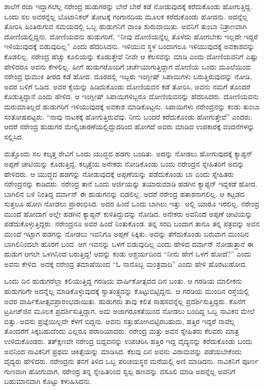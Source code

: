 ಶಾಲೆಗೆ ರಜಾ ಇದ್ದಾಗಲೆಲ್ಲ ನರೇಂದ್ರ ಹುಡುಗರನ್ನು ಬೇರೆ ಬೇರೆ ಕಡೆ ನೋಡುವುದಕ್ಕೆ ಕರೆದುಕೊಂಡು ಹೋಗುತ್ತಿದ್ದ. ಒಂದು ಸಲ ಅವರನ್ನೆಲ್ಲ ಬೊಟಾನಿಕಲ್ ತೋಟಕ್ಕೆ ಗಂಗಾನದಿಯ ಮೂಲಕ ಕರೆದುಕೊಂಡು ಹೋದನು. ಅದನ್ನೆಲ್ಲ ತೋರಿಸಿ ಹಿಂತಿರುಗುವ ಸಮಯದಲ್ಲಿ ಒಬ್ಬ ಹುಡುಗನಿಗೆ ವಾಂತಿ ಶುರುವಾಯಿತು. ಅವನಿಗೆ ತುಂಬಾ ನಿತ್ರಾಣವಾಗಿ ದೋಣಿಯಲ್ಲಿದ್ದನು. ದೋಣಿಯವನು ಹುಡುಗರಿಗೆ, “ನೀವು ದೋಣಿಯನ್ನೆಲ್ಲ ತೊಳೆದು ಹೋಗಬೇಕು ಇಲ್ಲದೇ ಇದ್ದರೆ ಇಳಿಯುವುದಕ್ಕೆ ಬಿಡುವುದಿಲ್ಲ” ಎಂದು ಹೆದರಿಸಿದನು. ಇಳಿಯುವ ಸ್ಥಳ ಬಂದಾಗಲೂ ಇಳಿಯುವುದಕ್ಕೆ ಅವಕಾಶವನ್ನು ಕೊಡಲಿಲ್ಲ. ನರೇಂದ್ರ ಹೆಚ್ಚು ಕೂಲಿಯನ್ನು ಕೊಡುತ್ತೇವೆ ನೀವೇ ಆ ಕೆಲಸವನ್ನು ಮಾಡಿ ಎಂದು ದೋಣಿಯವನಿಗೆ ಎಷ್ಟು ಹೇಳಿದರೂ ಅವನು ಕೇಳಲಿಲ್ಲ. ಹೀಗೆ ಹುಡುಗರೊಂದಿಗೆ ಚರ್ಚೆಯಾಗುತ್ತಿದ್ದಾಗ ದೋಣಿಯ ಒಂದು ಮೂಲೆಯಿಂದ ನರೇಂದ್ರ ಧುಮುಕಿ ತೀರದ ಕಡೆ ಹೋದ. ದೂರದಲ್ಲಿ ಇಬ್ಬರು ಇಂಗ್ಲೀಷ್ ಸಿಪಾಯಿಗಳು ಬರುತ್ತಿರುವುದನ್ನು ನೋಡಿ, ಅವರ ಬಳಿಗೆ ಓಡಿದ. ಅವರ ಕೈಯನ್ನು ಹಿಡಿದುಕೊಂಡು ದೋಣಿಯವನ ಕಡೆ ತೋರಿಸಿ, ಅವನು ನಮಗೆ ತೊಂದರೆ ಕೊಡುತ್ತಿದ್ದಾನೆ ಎಂದು ಹೇಳಿದ. ಆ ಇಂಗ್ಲೀಷ್ ಸಿಪಾಯಿಗಳಿಬ್ಬರೂ ದೋಣಿಯವನನ್ನು ಹೆದರಿಸಿದರು. ದೋಣಿಯವನು ಮರುಮಾತಿಲ್ಲದೆ ಹುಡುಗರಿಗೆ ಇಳಿಯುವುದಕ್ಕೆ ಅವಕಾಶ ಮಾಡಿಕೊಟ್ಟನು. ಸಿಪಾಯಿಗಳು ನರೇಂದ್ರನನ್ನು ಕಂಡು ತುಂಬಾ ಸಂತೋಷಪಟ್ಟರು. “ನಾವು ನಾಟಕಕ್ಕೆ ಹೋಗುತ್ತಿರುವೆವು. ನೀನು ಬಂದರೆ ಕರೆದುಕೊಂಡು ಹೋಗುತ್ತೇವೆ” ಎಂದರು. ಆದರೆ ನರೇಂದ್ರ ಹುಡುಗರ ಮೇಲ್ವಿಚಾರಣೆಯಲ್ಲಿದ್ದುದರಿಂದ ಹೋಗದೆ ಅವರು ಮಾಡಿದ ಉಪಕಾರಕ್ಕೆ ವಂದನೆಗಳನ್ನು ಸಲ್ಲಿಸಿದ.

ಮತ್ತೊಂದು ಸಲ ಕಲ್ಕತ್ತ ರೇವಿಗೆ ಒಂದು ಯುದ್ಧದ ಹಡಗು ಬಂದಿತು. ಅದನ್ನು ನೋಡಲು ಹೋಗುವುದಕ್ಕೆ ಕ್ಯಾಪ್ಟನ್ ಅಪ್ಪಣೆ ಚೀಟಿಯನ್ನು ಕೊಡುತ್ತಿದ್ದ. ಕಲ್ಕತ್ತೆಯ ಅನೇಕರು ನೋಡಿಕೊಂಡು ಬಂದು ನರೇಂದ್ರನ ಸ್ನೇಹಿತರಿಗೆ ಅದನ್ನು ಹೇಳಿದರು. ಆ ಯುದ್ಧದ ಹಡಗನ್ನು ನೋಡುವುದಕ್ಕೆ ಅಪ್ಪಣೆಯನ್ನು ಪಡೆದುಕೊಂಡು ಬಾ ಎಂದು ಸ್ನೇಹಿತರು ನರೇಂದ್ರನನ್ನು ಕಾಡಿದರು. ನರೇಂದ್ರ ತಾನೆ ಒಂದು ಅರ್ಜಿಯನ್ನು ತಯಾರುಮಾಡಿ ಹಡಗಿನ ಕ್ಯಾಪ್ಟನ್ ಇದ್ದಕಡೆ ಹೋದ. ಬಾಗಿಲಿನ ಬಳಿ ನಿಂತಿದ್ದ ದರ್ವಾನ್ ಈ ಹುಡುಗನನ್ನು ಬಿಡಲಿಲ್ಲ. ಆದರೆ ನರೇಂದ್ರ ಹತಾಶನಾಗಲಿಲ್ಲ. ಆ ಕಟ್ಟಡದ ಸುತ್ತಲೂ ಹೋಗಿ ನೋಡಲು ಪ್ರಾರಂಭಿಸಿದ. ಅದರ ಹಿಂದೆ ಒಂದು ಬಾಗಿಲು ಇತ್ತು. ಅಲ್ಲಿ ಯಾರೂ ಇರಲಿಲ್ಲ. ನರೇಂದ್ರ ಮುಂದೆ ಹೋದಾಗ ಅಲ್ಲೇ ಹಡಗಿನ ಕ್ಯಾಪ್ಟನ್ ಕುಳಿತಿದ್ದುದನ್ನು ನೋಡಿದ. ಅನೇಕರು ಅವನಿಂದ ಅಪ್ಪಣೆ ಚೀಟಿಯನ್ನು ಪಡೆದುಕೊಳ್ಳುತ್ತಿದ್ದರು. ನರೇಂದ್ರನೂ ಅವರ ಹಿಂದೆ ನಿಂತುಕೊಂಡ. ತನ್ನ ಸರದಿ ಬಂದಾಗ ತಾನೂ ತನ್ನ ಪತ್ರವನ್ನು ಅವನ ಮುಂದೆ ಇಟ್ಟಾಗ ಹಡಗನ್ನು ನೋಡಲು ಇವನಿಗೂ ಅಪ್ಪಣೆ ಸಿಕ್ಕಿತು. ಅದನ್ನು ತೆಗೆದುಕೊಂಡು ಬರುವಾಗ ಮುಂದಿನ ಬಾಗಿಲಿನಿಂದಲೇ ಹೊರಗೆ ಬಂದ. ಆಗ ಇವನನ್ನು ಒಳಗೆ ಬಿಡುವುದಿಲ್ಲ ಎಂದು ಹೇಳಿದ ದರ್ವಾನ್ ನೋಡುತ್ತಾನೆ ಈ ಹುಡುಗ ಆಗಲೇ ಒಳಗಿನಿಂದ ಬರುತ್ತಿದ್ದ! ಅದನ್ನು ಕಂಡು ಆಶ್ಚರ್ಯದಿಂದ “ನೀನು ಹೇಗೆ ಒಳಗೆ ಹೋದೆ?” ಎಂದು ಅವನು ಕೇಳಿದ. ಅದಕ್ಕೆ ನರೇಂದ್ರ ತಮಾಷೆಯಿಂದ “ಓ ನಾನೊಬ್ಬ ಮಂತ್ರವಾದಿ” ಎಂದು ಹೇಳಿ ಹೊರಟುಹೋದ.

ಒಂದು ದಿನ ಹುಡುಗರೆಲ್ಲಾ ಕಲಿಯುತ್ತಿದ್ದ ಗರಡಿಯ ವಾರ್ಷಿಕೋತ್ಸವದ ದಿನ ಬಂತು. ಆ ಗರಡಿಯ ಮಾಲೀಕನು ಹುಡುಗರಿಗೇ ಅದನ್ನೆಲ್ಲ ಮಾಡಿಕೊಳ್ಳುವುದಕ್ಕೆ ಸ್ವಾತಂತ್ರ್ಯವನ್ನು ಕೊಟ್ಟುಬಿಟ್ಟಿದ್ದನು. ಆ ಗರಡಿಯ ಮುಂದಿನ ರಸ್ತೆಯಲ್ಲಿ ಅವರ ವಾರ್ಷಿಕೋತ್ಸವ\break ಪ್ರಾರಂಭವಾಯಿತು. ಹುಡುಗರು ತಾವು ಕಲಿತ ಸಾಹಸವನ್ನೆಲ್ಲ ಪ್ರದರ್ಶಿಸುತ್ತಿದ್ದರು. ಕೊನೆಗೆ ಟ್ರಪೀಜ್​ಜಿನ ಮೂಲಕ ಪ್ರದರ್ಶಿಸುತ್ತಿದ್ದಾಗ, ಅದು ಅಜಾಗರೂಕತೆಯಿಂದ ನೋಡಲು ಬಂದಿದ್ದ ಒಬ್ಬ ನಾವಿಕನ ಮೇಲೆ ಬಿತ್ತು. ಅವನು ಪ್ರಜ್ಞೆಯಿಲ್ಲದೇ ಕೆಳಗೆ ಬಿದ್ದನು. ಅವನು ಸತ್ತುಹೋಗಿಬಿಟ್ಟಿರಬಹುದು, ಹತ್ತಿರ ಇದ್ದರೆ ನಾವೆಲ್ಲ ತೊಂದರೆಗೆ ಸಿಕ್ಕಬಹುದೆಂದು ಎಲ್ಲರೂ ಪರಾರಿಯಾದರು. ನರೇಂದ್ರ ಮತ್ತು ಅವನ ಸ್ನೇಹಿತರು ಕೆಲವರು ಮಾತ್ರ ಉಳಿದುಕೊಂಡರು. ತತ್‍ಕ್ಷಣವೇ ನರೇಂದ್ರ ಬಿದ್ದವನನ್ನು ಉಪಚರಿಸಿ ಹತ್ತಿರ ಇದ್ದ ವೈದ್ಯನನ್ನು ಕರೆದುಕೊಂಡು ಬಂದು ಅವನಿಂದ ನಾವಿಕನಿಗೆ ಪ್ರಥಮ ಚಿಕಿತ್ಸೆಯನ್ನು ಮಾಡಿಸಿದ. ಕೆಲವು ದಿನ ಅವನು ವಿರಾಮವನ್ನು ಪಡೆಯಬೇಕೆಂದು ವೈದ್ಯರು ಹೇಳಿದರು. ನರೇಂದ್ರನು ತನಗೆ ತಿಳಿದ ಒಬ್ಬ ಪರಿಚಯಸ್ಥರ ಮನೆಯಲ್ಲಿ ಅಣಿ ಮಾಡಿದನು. ನಾವಿಕನಿಗೆ ಪೂರ್ಣ ಗುಣವಾಗಿ ಹೋಗುವಾಗ, ನರೇಂದ್ರ ತನ್ನ ಸ್ನೇಹಿತರಿಂದ ಸ್ವಲ್ಪ ಹಣವನ್ನು ವಸೂಲಿ ಮಾಡಿ ಅದನ್ನೆಲ್ಲ ಅವನಿಗೆ ಬಹುಮಾನವಾಗಿ ಕೊಟ್ಟು ಕಳುಹಿಸಿದನು.

